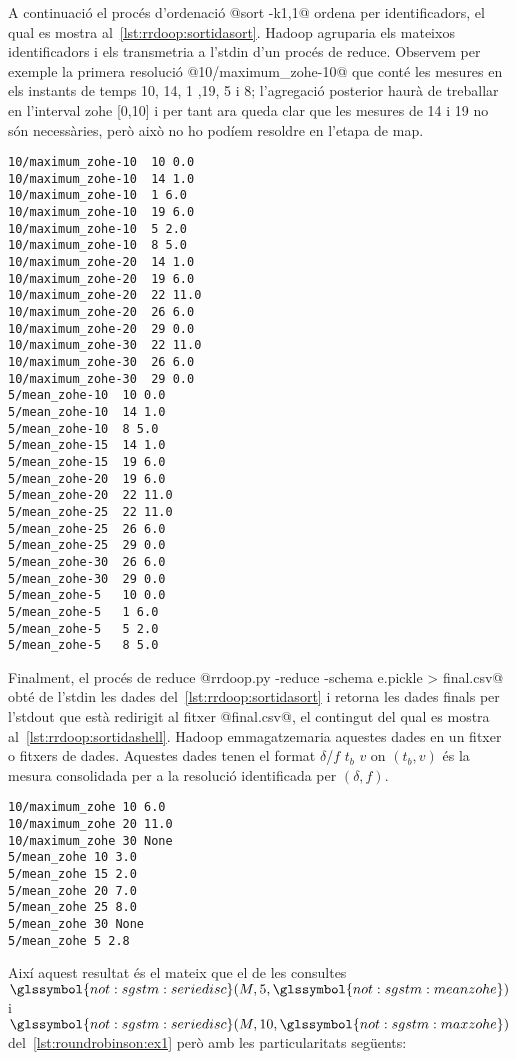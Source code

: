 A continuació el procés d'ordenació @sort -k1,1@ ordena per
identificadors, el qual es mostra
al~\autoref{lst:rrdoop:sortidasort}. Hadoop agruparia els mateixos
identificadors i els transmetria a l'stdin d'un procés de reduce.
Observem per exemple la primera resolució @10/maximum_zohe-10@ que
conté les mesures en els instants de temps 10, 14, 1 ,19, 5 i 8;
l'agregació posterior haurà de treballar en l'interval \gls{zohe}
[0,10] i per tant ara queda clar que les mesures de 14 i 19 no són
necessàries, però això no ho podíem resoldre en l'etapa de map.
\begin{lstlisting}[style=stdout,caption=Sortida del procés d'ordenació,label=lst:rrdoop:sortidasort]
10/maximum_zohe-10	10 0.0
10/maximum_zohe-10	14 1.0
10/maximum_zohe-10	1 6.0
10/maximum_zohe-10	19 6.0
10/maximum_zohe-10	5 2.0
10/maximum_zohe-10	8 5.0
10/maximum_zohe-20	14 1.0
10/maximum_zohe-20	19 6.0
10/maximum_zohe-20	22 11.0
10/maximum_zohe-20	26 6.0
10/maximum_zohe-20	29 0.0
10/maximum_zohe-30	22 11.0
10/maximum_zohe-30	26 6.0
10/maximum_zohe-30	29 0.0
5/mean_zohe-10	10 0.0
5/mean_zohe-10	14 1.0
5/mean_zohe-10	8 5.0
5/mean_zohe-15	14 1.0
5/mean_zohe-15	19 6.0
5/mean_zohe-20	19 6.0
5/mean_zohe-20	22 11.0
5/mean_zohe-25	22 11.0
5/mean_zohe-25	26 6.0
5/mean_zohe-25	29 0.0
5/mean_zohe-30	26 6.0
5/mean_zohe-30	29 0.0
5/mean_zohe-5	10 0.0
5/mean_zohe-5	1 6.0
5/mean_zohe-5	5 2.0
5/mean_zohe-5	8 5.0
\end{lstlisting}


Finalment, el procés de reduce %
@rrdoop.py -reduce -schema e.pickle > final.csv@ obté de l'stdin les
dades del~\autoref{lst:rrdoop:sortidasort} i retorna les dades finals
per l'stdout que està redirigit al fitxer @final.csv@, el contingut
del qual es mostra al~\autoref{lst:rrdoop:sortidashell}.  Hadoop
emmagatzemaria aquestes dades en un fitxer o fitxers de dades.
Aquestes dades tenen el format $\delta$/$f$ $t_b$ $v$ on $(t_b,v)$ és
la mesura consolidada per a la resolució identificada per
$(\delta,f)$.

\begin{lstlisting}[style=file,caption=Dades de sortida final.csv,label=lst:rrdoop:sortidashell]
10/maximum_zohe	10 6.0
10/maximum_zohe	20 11.0
10/maximum_zohe	30 None
5/mean_zohe	10 3.0
5/mean_zohe	15 2.0
5/mean_zohe	20 7.0
5/mean_zohe	25 8.0
5/mean_zohe	30 None
5/mean_zohe	5 2.8
\end{lstlisting}

Així aquest resultat és el mateix que el de les consultes $\glssymbol{not:sgstm:seriedisc}(M,5,\glssymbol{not:sgstm:meanzohe})$ i $\glssymbol{not:sgstm:seriedisc}(M,10,\glssymbol{not:sgstm:maxzohe})$ del~\autoref{lst:roundrobinson:ex1} però amb les particularitats següents:

